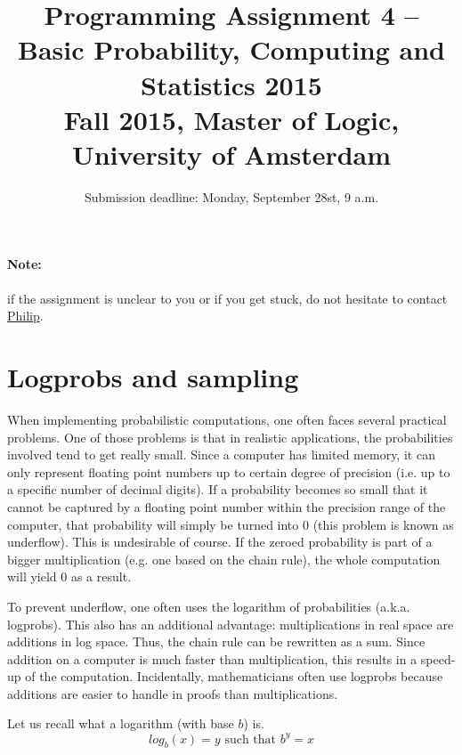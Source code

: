 \documentclass[11pt, leqno, a4paper]{article}
\title{Programming Assignment 4 -- Basic Probability, Computing and Statistics 2015 \\[2mm]
\large{Fall 2015, Master of Logic, University of Amsterdam}}
\author{}
\date{Submission deadline: Monday, September 28st, 9 a.m.}
\begin{document}
\maketitle

\paragraph{Note:} if the assignment is unclear to you or if you get stuck, do not hesitate to contact \href{mailto:P.Schulz@uva.nl}{Philip}.

\section{Logprobs and sampling}
When implementing probabilistic computations, one often faces several practical problems. One of those 
problems is that in realistic applications, the probabilities involved tend to get really small. Since
a computer has limited memory, it can only represent floating point numbers up to certain degree of precision
(i.e. up to a specific number of decimal digits). If a probability becomes so small that it cannot
be captured by a floating point number within the precision range of the computer, that probability will
simply be turned into 0 (this problem is known as underflow). 
This is undesirable of course. If the zeroed probability is part of a bigger 
multiplication (e.g. one based on the chain rule), the whole computation will yield 0 as a result. 

To prevent underflow, one often uses the logarithm of probabilities (a.k.a. logprobs). This also has an
additional advantage: multiplications in real space are additions in log space. Thus, the chain rule
can be rewritten as a sum. Since addition on a computer is much faster than multiplication, this results
in a speed-up of the computation. Incidentally, mathematicians often use logprobs because additions
are easier to handle in proofs than multiplications.

Let us recall what a logarithm (with base $ b $) is.
\begin{equation}
log_{b}(x) = y \mbox{ such that } b^{y} = x
\end{equation}
\end{document}
